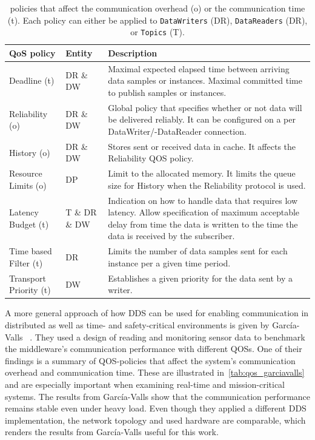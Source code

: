 \begin{table}[h!]
	\begin{center}
		\caption{ policies that affect the communication overhead (o) or the communication time (t). Each  policy can either be applied to \texttt{DataWriters} (DR), \texttt{DataReaders} (DR), or \texttt{Topics} (T).}
		\label{tab:qos_garciavalls}
		\begin{tabularx}{\textwidth}{|l|l|X|}
			\hline
			\textbf{QoS policy} & \textbf{Entity} & \textbf{Description}\\
			\hline \hline
			Deadline (t) & DR \& DW & Maximal expected elapsed time between arriving data samples or instances. Maximal committed time to publish samples or instances.\\
			\hline
			Reliability (o) & DR \& DW & Global policy that specifies whether or not data will be delivered reliably. It can be configured on a per DataWriter/-DataReader connection. \\
			\hline
			History (o) & DR \& DW & Stores sent or received data in cache. It affects the Reliability \gls*{QOS} policy. \\
			\hline
			Resource Limits (o) & DP & Limit to the allocated memory. It limits the queue size for History when the Reliability protocol is used. \\
			\hline
			Latency Budget (t) & T \& DR \& DW & Indication on how to handle data that requires low latency. Allow specification of maximum acceptable delay from time the data is written to the time the data is received by the subscriber. \\
			\hline
			Time based Filter (t) & DR & Limits the number of data samples sent for each instance per a given time period. \\
			\hline
			Transport Priority (t) & DW & Establishes a given priority for the data sent by a writer.\\
			\hline
		\end{tabularx}
	\end{center}
\end{table}

A more general approach of how \gls*{DDS} can be used for enabling communication in distributed as well as time- and safety-critical environments is given by García-Valls \etal~\cite{GarciaVallsDDSInDistributed}.
They used a design of reading and monitoring sensor data to benchmark the middleware's communication performance with different \glspl*{QOS}.
One of their findings is a summary of \gls*{QOS}-policies that affect the system's communication overhead and communication time.
These are illustrated in~\autoref{tab:qos_garciavalls} and are especially important when examining real-time and mission-critical systems.
The results from García-Valls \etal show that the communication performance remains stable even under heavy load.
Even though they applied a different \gls*{DDS} implementation, the network topology and used hardware are comparable, which renders the results from García-Valls \etal useful for this work.

